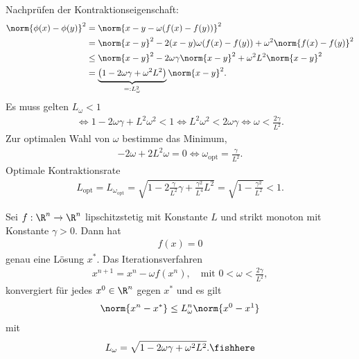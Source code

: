 Nachprüfen der Kontraktionseigenschaft:
\begin{align*}
\norm{\phi(x)-\phi(y)}^2 &= \norm{x-y-\omega(f(x)-f(y))}^2
\\ &= \norm{x-y}^2 - 2(x-y)\omega(f(x)-f(y)) + \omega^2\norm{f(x)-f(y)}^2\\
&\le \norm{x-y}^2 - 2\omega\gamma\norm{x-y}^2
+ \omega^2 L^2\norm{x-y}^2\\
&= \underbrace{\left( 1-2\omega\gamma + \omega^2 L^2 \right)}_{=:
L_\omega^2}\norm{x-y}^2.
\end{align*}
Es muss gelten $L_\omega < 1$
\begin{align*}
\Leftrightarrow 1-2\omega\gamma + L^2\omega^2 <1
\Leftrightarrow L^2 \omega^2 < 2\omega\gamma
\Leftrightarrow \omega < \frac{2\gamma}{L^2}.
\end{align*}
Zur optimalen Wahl von $\omega$ bestimme das Minimum,
\begin{align*}
-2\omega + 2L^2 \omega = 0 \Leftrightarrow \omega_\text{opt} =
\frac{\gamma}{L^2}.
\end{align*}
Optimale Kontraktionsrate
\begin{align*}
L_\text{opt} = L_{\omega_\text{opt}} = \sqrt{1-2\frac{\gamma}{L^2}\gamma +
\frac{\gamma^2}{L^4}L^2} = \sqrt{1-\frac{\gamma^2}{L^2}} < 1.
\end{align*}

\begin{prop}
\label{prop:5.4}
Sei $f: \R^n\to\R^n$ lipschitzstetig mit Konstante $L$ und strikt monoton mit
Konstante $\gamma>0$. Dann hat
\begin{align*}
f(x) = 0
\end{align*}
genau eine Lösung $x^*$. Das Iterationsverfahren
\begin{align*}
x^{n+1} = x^n - \omega
f(x^n),\quad\text{mit } 0 < \omega <\frac{2\gamma}{L^2},
\end{align*}
 konvergiert für jedes $x^0\in\R^n$
gegen $x^*$ und es gilt
\begin{align*}
\norm{x^n-x^*} \le L_\omega^n\norm{x^0-x^1}
\end{align*}
mit
\begin{align*}
L_\omega = \sqrt{1-2\omega\gamma + \omega^2 L^2}.\fishhere
\end{align*}
\end{prop}

